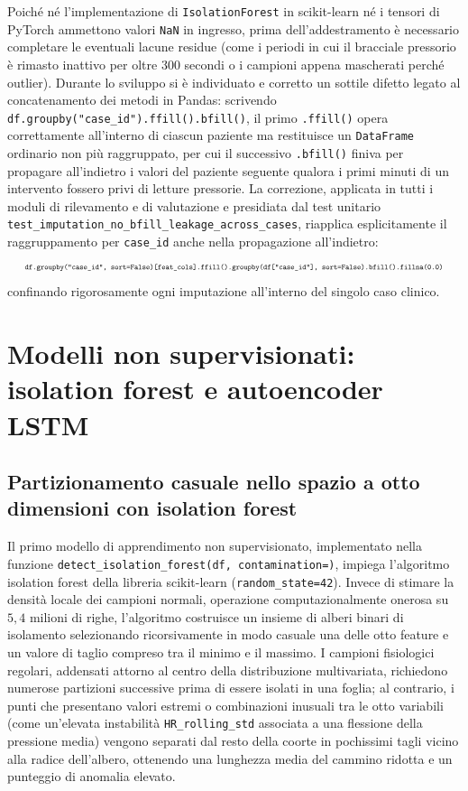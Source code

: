 Poich\'e n\'e l'implementazione di \texttt{IsolationForest} in scikit-learn n\'e i tensori di PyTorch ammettono valori \texttt{NaN} in ingresso, prima dell'addestramento \`e necessario completare le eventuali lacune residue (come i periodi in cui il bracciale pressorio \`e rimasto inattivo per oltre $300$ secondi o i campioni appena mascherati perch\'e outlier). Durante lo sviluppo si \`e individuato e corretto un sottile difetto legato al concatenamento dei metodi in Pandas: scrivendo \texttt{df.groupby("case\_id").\allowbreak ffill().\allowbreak bfill()}, il primo \texttt{.ffill()} opera correttamente all'interno di ciascun paziente ma restituisce un \texttt{DataFrame} ordinario non pi\`u raggruppato, per cui il successivo \texttt{.bfill()} finiva per propagare all'indietro i valori del paziente seguente qualora i primi minuti di un intervento fossero privi di letture pressorie. La correzione, applicata in tutti i moduli di rilevamento e di valutazione e presidiata dal test unitario \texttt{test\_\allowbreak imputation\_\allowbreak no\_\allowbreak bfill\_\allowbreak leakage\_\allowbreak across\_\allowbreak cases}, riapplica esplicitamente il raggruppamento per \texttt{case\_id} anche nella propagazione all'indietro:
$$\resizebox{0.96\textwidth}{!}{$\texttt{df.groupby("case\_id", sort=False)[feat\_cols].ffill().groupby(df["case\_id"], sort=False).bfill().fillna(0.0)}$}$$
confinando rigorosamente ogni imputazione all'interno del singolo caso clinico.

\section{Modelli non supervisionati: isolation forest e autoencoder LSTM}

\subsection{Partizionamento casuale nello spazio a otto dimensioni con isolation forest}
Il primo modello di apprendimento non supervisionato, implementato nella funzione \texttt{detect\_\allowbreak isolation\_\allowbreak forest(df,\allowbreak\ contamination=)}, impiega l'algoritmo isolation forest della libreria scikit-learn (\texttt{random\_\allowbreak state=42}). Invece di stimare la densit\`a locale dei campioni normali, operazione computazionalmente onerosa su $5,4$ milioni di righe, l'algoritmo costruisce un insieme di alberi binari di isolamento selezionando ricorsivamente in modo casuale una delle otto feature e un valore di taglio compreso tra il minimo e il massimo. I campioni fisiologici regolari, addensati attorno al centro della distribuzione multivariata, richiedono numerose partizioni successive prima di essere isolati in una foglia; al contrario, i punti che presentano valori estremi o combinazioni inusuali tra le otto variabili (come un'elevata instabilit\`a \texttt{HR\_\allowbreak rolling\_std} associata a una flessione della pressione media) vengono separati dal resto della coorte in pochissimi tagli vicino alla radice dell'albero, ottenendo una lunghezza media del cammino ridotta e un punteggio di anomalia elevato.

